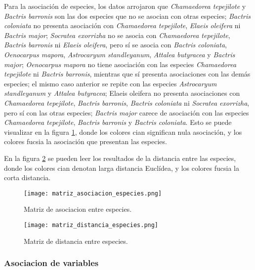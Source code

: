 \documentclass[11pt,]{article}
\begin{document}
Para la asociación de especies, los datos arrojaron que
\emph{Chamaedorea tepejilote} y \emph{Bactris barronis} son las dos
especies que no se asocian con otras especies; \emph{Bactris coloniata}
no presenta asociación con \emph{Chamaedorea tepejilote}, \emph{Elaeis
oleifera} ni \emph{Bactris major}; \emph{Socratea exorrizha} no se
asocia con \emph{Chamaedorea tepejilote}, \emph{Bactris barronis} ni
\emph{Elaeis oleifera}, pero sí se asocia con \emph{Bactris coloniata},
\emph{Oenocarpus mapora}, \emph{Astrocaryum standleyanum}, \emph{Attalea
butyracea} y \emph{Bactris major}; \emph{Oenocarpus mapora} no tiene
asociación con las especies \emph{Chamaedorea tepejilote} ni
\emph{Bactris barronis}, mientras que sí presenta asociaciones con las
demás especies; el mismo caso anterior se repite con las especies
\emph{Astrocaryum standleyanum} y \emph{Attalea butyracea}; Elaeis
oleifera no presenta asociaciones con \emph{Chamaedorea tepejilote},
\emph{Bactris barronis}, \emph{Bactris coloniata} ni \emph{Socratea
exorrizha}, pero sí con las otras especies; \emph{Bactris major} carece
de asociación con las especies \emph{Chamaedorea tepejilote},
\emph{Bactris barronis} y \emph{Bactris coloniata}. Esto se puede
visualizar en la figura \ref{fig:matriz_asociacion_especies}, donde los
colores cian significan nula asociación, y los colores fucsia la
asociación que presentan las especies.

En la figura \ref{fig:matriz_distancia_especies} se pueden leer los
resultados de la distancia entre las especies, donde los colores cian
denotan larga distancia Euclídea, y los colores fucsia la corta
distancia.

\begin{figure}
\centering
\texttt{[image: matriz\_asociacion\_especies.png]}
\caption{Matriz de asociacion entre especies.
\label{fig:matriz_asociacion_especies}}
\end{figure}

\begin{figure}
\centering
\texttt{[image: matriz\_distancia\_especies.png]}
\caption{Matriz de distancia entre especies.
\label{fig:matriz_distancia_especies}}
\end{figure}

\subsubsection{Asociacion de variables}\label{asociacion-de-variables}
\end{document}
